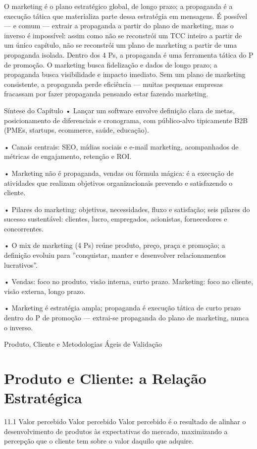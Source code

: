 O marketing é o plano estratégico global, de longo prazo; a propaganda é a execução tática que materializa parte dessa estratégia em mensagens. É possível — e comum — extrair a propaganda a partir do plano de marketing, mas o inverso é impossível: assim como não se reconstrói um TCC inteiro a partir de um único capítulo, não se reconstrói um plano de marketing a partir de uma propaganda isolada. Dentro dos 4 Ps, a propaganda é uma ferramenta tática do P de promoção. O marketing busca fidelização e dados de longo prazo; a propaganda busca visibilidade e impacto imediato. Sem um plano de marketing consistente, a propaganda perde eficiência — muitas pequenas empresas fracassam por fazer propaganda pensando estar fazendo marketing.

Síntese do Capítulo • Lançar um software envolve definição clara de metas, posicionamento de diferenciais e cronograma, com público-alvo tipicamente B2B (PMEs, startups, ecommerce, saúde, educação).

• Canais centrais: SEO, mídias sociais e e-mail marketing, acompanhados de métricas de engajamento, retenção e ROI.

• Marketing não é propaganda, vendas ou fórmula mágica: é a execução de atividades que realizam objetivos organizacionais prevendo e satisfazendo o cliente.

• Pilares do marketing: objetivos, necessidades, fluxo e satisfação; seis pilares do sucesso sustentável: clientes, lucro, empregados, acionistas, fornecedores e concorrentes.

• O mix de marketing (4 Ps) reúne produto, preço, praça e promoção; a definição evoluiu para ”conquistar, manter e desenvolver relacionamentos lucrativos”.

• Vendas: foco no produto, visão interna, curto prazo. Marketing: foco no cliente, visão externa, longo prazo.

• Marketing é estratégia ampla; propaganda é execução tática de curto prazo dentro do P de promoção — extrai-se propaganda do plano de marketing, nunca o inverso.

Produto, Cliente e Metodologias Ágeis de Validação

\chapter{Produto e Cliente: a Relação Estratégica}

11.1 Valor percebido Valor percebido Valor percebido é o resultado de alinhar o desenvolvimento de produtos às expectativas do mercado, maximizando a percepção que o cliente tem sobre o valor daquilo que adquire.

